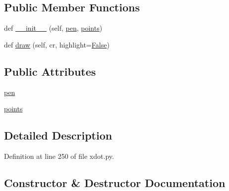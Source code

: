 \subsection*{Public Member Functions}
\begin{DoxyCompactItemize}
\item 
def \hyperlink{classsmacc__viewer_1_1xdot_1_1xdot_1_1LineShape_ac13501ec0b4909d311adabea756e0227}{\+\_\+\+\_\+init\+\_\+\+\_\+} (self, \hyperlink{classsmacc__viewer_1_1xdot_1_1xdot_1_1LineShape_a16342608ce6256e5d6d51a84c03bf233}{pen}, \hyperlink{classsmacc__viewer_1_1xdot_1_1xdot_1_1LineShape_a68e8fd028bbfa9bb1dfd04fa96400d39}{points})
\item 
def \hyperlink{classsmacc__viewer_1_1xdot_1_1xdot_1_1LineShape_a25a1eb5c976ae0c8f5ac97b6ddb2afef}{draw} (self, cr, highlight=\hyperlink{namespacesmacc__viewer_a5928e8da279785cbab9011356c3eaa87}{False})
\end{DoxyCompactItemize}
\subsection*{Public Attributes}
\begin{DoxyCompactItemize}
\item 
\hyperlink{classsmacc__viewer_1_1xdot_1_1xdot_1_1LineShape_a16342608ce6256e5d6d51a84c03bf233}{pen}
\item 
\hyperlink{classsmacc__viewer_1_1xdot_1_1xdot_1_1LineShape_a68e8fd028bbfa9bb1dfd04fa96400d39}{points}
\end{DoxyCompactItemize}


\subsection{Detailed Description}


Definition at line 250 of file xdot.\+py.



\subsection{Constructor \& Destructor Documentation}
